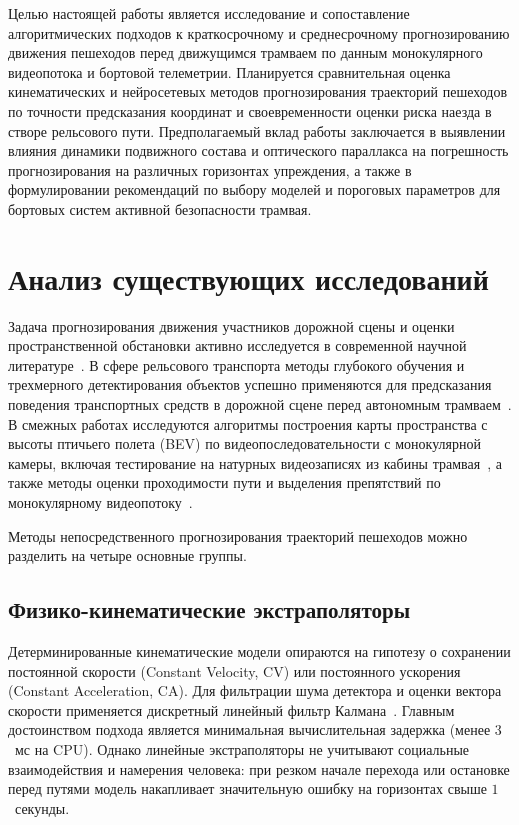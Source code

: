 \documentclass{misisarticle}
\begin{document}
Целью настоящей работы является исследование и сопоставление алгоритмических подходов к краткосрочному и среднесрочному прогнозированию движения пешеходов перед движущимся трамваем по данным монокулярного видеопотока и бортовой телеметрии. Планируется сравнительная оценка кинематических и нейросетевых методов прогнозирования траекторий пешеходов по точности предсказания координат и своевременности оценки риска наезда в створе рельсового пути. Предполагаемый вклад работы заключается в выявлении влияния динамики подвижного состава и оптического параллакса на погрешность прогнозирования на различных горизонтах упреждения, а также в формулировании рекомендаций по выбору моделей и пороговых параметров для бортовых систем активной безопасности трамвая.

\section{Анализ существующих исследований}

Задача прогнозирования движения участников дорожной сцены и оценки пространственной обстановки активно исследуется в современной научной литературе~\cite{rudenko2020}. В сфере рельсового транспорта методы глубокого обучения и трехмерного детектирования объектов успешно применяются для предсказания поведения транспортных средств в дорожной сцене перед автономным трамваем~\cite{guzhva2022}. В смежных работах исследуются алгоритмы построения карты пространства с высоты птичьего полета (BEV) по видеопоследовательности с монокулярной камеры, включая тестирование на натурных видеозаписях из кабины трамвая~\cite{kozhukhov2023}, а также методы оценки проходимости пути и выделения препятствий по монокулярному видеопотоку~\cite{vasilchikov2026}.

Методы непосредственного прогнозирования траекторий пешеходов можно разделить на четыре основные группы.

\subsection{Физико-кинематические экстраполяторы}

Детерминированные кинематические модели опираются на гипотезу о сохранении постоянной скорости (Constant Velocity, CV) или постоянного ускорения (Constant Acceleration, CA). Для фильтрации шума детектора и оценки вектора скорости применяется дискретный линейный фильтр Калмана~\cite{kalman1960}. Главным достоинством подхода является минимальная вычислительная задержка (менее $3$~мс на CPU). Однако линейные экстраполяторы не учитывают социальные взаимодействия и намерения человека: при резком начале перехода или остановке перед путями модель накапливает значительную ошибку на горизонтах свыше $1$~секунды.
\end{document}
